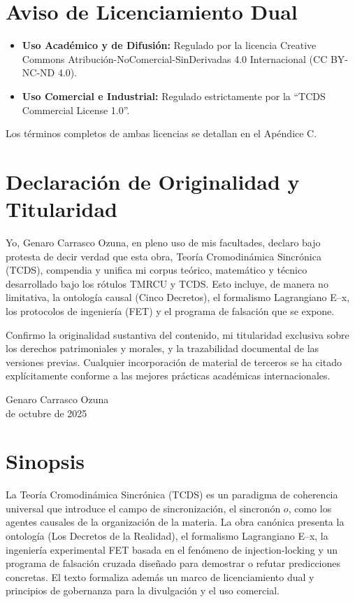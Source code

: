 \documentclass[12pt,openright]{book}
\begin{document}
\bigskip
\section*{Aviso de Licenciamiento Dual}
\begin{itemize}
  \item \textbf{Uso Académico y de Difusión:} Regulado por la licencia Creative Commons Atribución-NoComercial-SinDerivadas 4.0 Internacional (CC BY-NC-ND 4.0).
  \item \textbf{Uso Comercial e Industrial:} Regulado estrictamente por la ``TCDS Commercial License 1.0''.
\end{itemize}
Los términos completos de ambas licencias se detallan en el Apéndice C.

\bigskip
\section*{Declaración de Originalidad y Titularidad}
Yo, Genaro Carrasco Ozuna, en pleno uso de mis facultades, declaro bajo protesta de decir verdad que esta obra, Teoría Cromodinámica Sincrónica (TCDS), compendia y unifica mi corpus teórico, matemático y técnico desarrollado bajo los rótulos TMRCU y TCDS. Esto incluye, de manera no limitativa, la ontología causal (Cinco Decretos), el formalismo Lagrangiano E--x, los protocolos de ingeniería (FET) y el programa de falsación que se expone.

Confirmo la originalidad sustantiva del contenido, mi titularidad exclusiva sobre los derechos patrimoniales y morales, y la trazabilidad documental de las versiones previas. Cualquier incorporación de material de terceros se ha citado explícitamente conforme a las mejores prácticas académicas internacionales.

\vspace{1ex}
\noindent Genaro Carrasco Ozuna \\
 de octubre de 2025

\bigskip
\section*{Sinopsis}
La Teoría Cromodinámica Sincrónica (TCDS) es un paradigma de coherencia universal que introduce el campo de sincronización, el sincronón \(o\), como los agentes causales de la organización de la materia. La obra canónica presenta la ontología (Los Decretos de la Realidad), el formalismo Lagrangiano E--x, la ingeniería experimental FET basada en el fenómeno de injection-locking y un programa de falsación cruzada diseñado para demostrar o refutar predicciones concretas. El texto formaliza además un marco de licenciamiento dual y principios de gobernanza para la divulgación y el uso comercial.
\end{document}
